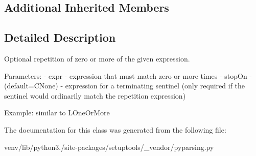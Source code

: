 \subsection*{Additional Inherited Members}


\subsection{Detailed Description}
\begin{DoxyVerb}Optional repetition of zero or more of the given expression.

Parameters:
 - expr - expression that must match zero or more times
 - stopOn - (default=C{None}) - expression for a terminating sentinel
      (only required if the sentinel would ordinarily match the repetition 
      expression)          

Example: similar to L{OneOrMore}
\end{DoxyVerb}
 

The documentation for this class was generated from the following file\+:\begin{DoxyCompactItemize}
\item 
venv/lib/python3./site-\/packages/setuptools/\+\_\+vendor/pyparsing.\+py\end{DoxyCompactItemize}
